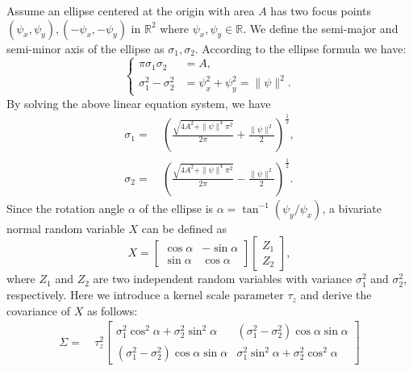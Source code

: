 \documentclass[journal]{IEEEtran}
\begin{document}
Assume an ellipse centered at the origin with area $A$ has two focus points $(\psi_x, \psi_y), (-\psi_x, -\psi_y)$ in $\mathbb{R}^2$ where $\psi_x, \psi_y \in \mathbb{R}$. 
We define the semi-major and semi-minor axis of the ellipse as $\sigma_1, \sigma_2$. 
According to the ellipse formula we have:
\[
    \left \{ 
    \begin{array}{rl}
        \pi \sigma_1 \sigma_2 &= A, \\
        \sigma_1^2 - \sigma_2^2 &= \psi_x^2 + \psi_y^2 = \|\psi\|^2.
    \end{array}
    \right .
    \label{Ellipse}
\]
By solving the above linear equation system, we have
\begin{align*}
\sigma_1 = &~(\frac{\sqrt{4A^2 + \|\psi\|^4\pi^2}}{2\pi} + \frac{\|\psi\|^2}{2})^{\frac{1}{2}}, \\
\sigma_2 = &~(\frac{\sqrt{4A^2 + \|\psi\|^4\pi^2}}{2\pi} - \frac{\|\psi\|^2}{2})^{\frac{1}{2}}.
\end{align*}
Since the rotation angle $\alpha$ of the ellipse is $\alpha = \tan^{-1}(\psi_y/\psi_x)$, a bivariate normal random variable $X$ can be defined as
\[
X = 
\begin{bmatrix} 
\cos{\alpha} & -\sin{\alpha} \\ 
\sin{\alpha} & \cos{\alpha} 
\end{bmatrix} 
\begin{bmatrix}
Z_1 \\
Z_2
\end{bmatrix},
\]
where $Z_1$ and $Z_2$ are two independent random variables with variance $\sigma_1^2$ and $\sigma_2^2$, respectively.  
Here we introduce a kernel scale parameter $\tau_z$ and derive the covariance of $X$ as follows:
\begin{align*}
    \Sigma 
    = &~\tau_z^2 
    \begin{bmatrix} 
    \sigma_1^2\cos^2 \alpha + \sigma_2^2 \sin^2\alpha & (\sigma_1^2 - \sigma_2^2)\cos{\alpha}\sin{\alpha} \\
    (\sigma_1^2 - \sigma_2^2)\cos{\alpha}\sin{\alpha} & \sigma_1^2\sin^2 \alpha + \sigma_2^2 \cos^2\alpha 
    \end{bmatrix}
\end{align*}
\end{document}
